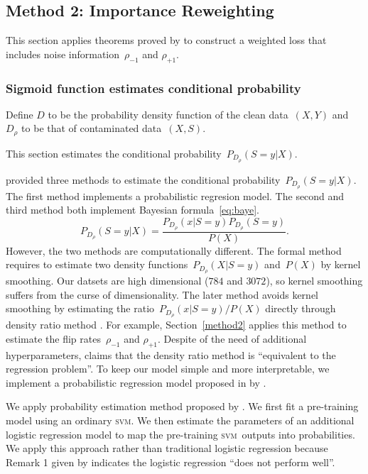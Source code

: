 \documentclass[12pt]{article} %
\newcommand{\svm}{\textsc{svm}}
\newcommand{\rhoo}{\rho_{+1}}
\newcommand{\rhoz}{\rho_{-1}}
\begin{document}


\subsection{Method 2: Importance Reweighting} \label{3rd}
This section applies theorems proved by \citet{liu2016classification} to construct a weighted loss that includes noise information~$\rhoz$ and $\rhoo$.

\subsubsection{Sigmoid function estimates conditional probability}\label{sigmoid}
Define $D$ to be the probability density function of the clean data~$(X,Y)$ and $D_\rho$ to be that of contaminated data~$(X,S)$.

This section estimates the conditional probability~$P_{D_\rho}(S=y|X)$.

\citet{liu2016classification} provided three methods to estimate the conditional probability~$P_{D_\rho}(S=y|X)$.
The first method implements a probabilistic regresion model.
The second and third method both implement Bayesian formula~\eqref{eq:baye}.
\begin{equation*}
   P_{D_\rho}(S=y|X)=\frac{P_{D_\rho}(x|S=y)P_{D_\rho}(S=y)}{P(X)}.
\end{equation*}
However, the two methods are computationally different. The formal method requires to estimate two density functions~$P_{D_\rho}(X|S=y)$ and~$P(X)$ by kernel smoothing. Our datsets are high dimensional ($784$ and $3072$), so kernel smoothing suffers from the curse of dimensionality. The later method avoids kernel smoothing by estimating the ratio~$P_{D_\rho}(x|S=y)/P(X)$ directly through density ratio method \citep{liu2016classification}. For example, Section~\ref{method2} applies this method to estimate the flip rates~$\rhoz$ and $\rhoo$. Despite of the need of additional hyperparameters,  \citet{Sugiyama10densityratio} claims that the density ratio method is ``equivalent to the regression problem''. To keep our model simple and more interpretable, we implement a probabilistic regression model proposed in by \citet[Section~5.1]{liu2016classification}.

We apply probability estimation method proposed by \citet{Platt99probabilisticoutputs}. We first fit a pre-training model using an ordinary \svm . We then estimate the parameters of an additional logistic regression model to map the pre-training \svm\ outputs into probabilities. We apply this approach rather than traditional logistic regression because Remark 1 given by \citet{liu2016classification} indicates the logistic regression ``does not perform well''.
\end{document}
